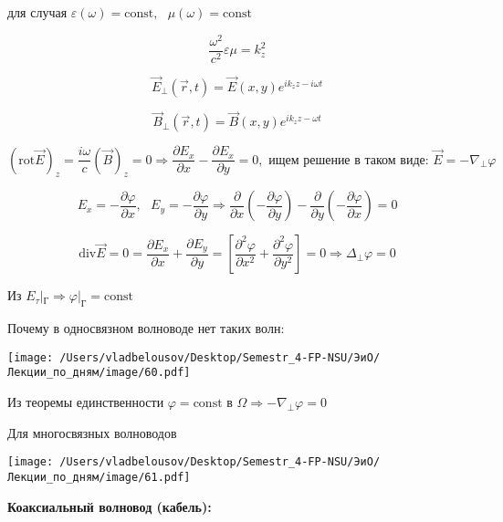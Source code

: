 \documentclass[12pt, a4paper]{report}
\begin{document}
\begin{center}
    для случая \( \varepsilon (\omega )= \mathrm{const}, \text{ } \mu( \omega ) = \mathrm{const}     \) 
\end{center}

\[ \frac{ \omega ^2 }{c ^2 } \varepsilon \mu = k_z ^2   \]

\[ \vec{E } _{\perp  }( \vec{r }, t      ) = \vec{E } (x,y )e^{ i k_z z - i \omega t }   \] 

\[ \vec{B } _{\perp  }(\vec{r } ,t ) = \vec{B } (x,y )e^{ i k_z z - \omega t}   \] 

\[ \left( \mathrm{rot }   \vec{E }  \right)_{z }  = \frac{ i \omega }{c } (\vec{B } )_z = 0 \Rightarrow \frac{\partial  E_x } {\partial  x } - \frac{ \partial  E_x }{\partial  y} = 0 , \text{  ищем решение в таком виде:  } \vec{E} = - \nabla_{ \perp }  \varphi     \] 

\[ E_x = - \frac{\partial  \varphi }{\partial x }, \text{  } E_y = - \frac{\partial  \varphi}{\partial  y } \Rightarrow \frac{ \partial  }{\partial  x }\left( - \frac{\partial  \varphi }{\partial  y }  \right)    - \frac{ \partial  }{\partial y  }\left( - \frac{\partial  \varphi }{\partial  x }  \right) = 0 \] 

\[ \mathrm{div } \vec{E } = 0 = \frac{\partial  E_x }{\partial  x } + \frac{\partial  E_y }{\partial  y }  = \left[ \frac{\partial  ^2 \varphi }{\partial  x ^2 }+ \frac{\partial  ^2 \varphi }{\partial  y ^2 }   \right] = 0 \Rightarrow \Delta_{\perp  }  \varphi =0   \] 

Из \( E_{\tau } | _{\text{Г} }  \Rightarrow \varphi|_{\text{Г} } = \mathrm{const}     \) 

Почему в односвязном волноводе нет таких волн: 

\begin{center}
    \texttt{[image: /Users/vladbelousov/Desktop/Semestr\_4-FP-NSU/ЭиО/Лекции\_по\_дням/image/60.pdf]}
\end{center}

Из теоремы единственности \( \varphi     = \mathrm{const}   \) в \( \Omega  \Rightarrow - \nabla _{ \perp } \varphi = 0\) 

Для многосвязных волноводов

\begin{center}
    \texttt{[image: /Users/vladbelousov/Desktop/Semestr\_4-FP-NSU/ЭиО/Лекции\_по\_дням/image/61.pdf]}
\end{center}

\textbf{Коаксиальный волновод (кабель):} 
\end{document}
